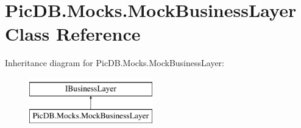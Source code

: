 \hypertarget{class_pic_d_b_1_1_mocks_1_1_mock_business_layer}{}\section{Pic\+D\+B.\+Mocks.\+Mock\+Business\+Layer Class Reference}
\label{class_pic_d_b_1_1_mocks_1_1_mock_business_layer}
Inheritance diagram for Pic\+D\+B.\+Mocks.\+Mock\+Business\+Layer\+:\begin{figure}[H]
\begin{center}
\leavevmode
\includegraphics[height=2.000000cm]{class_pic_d_b_1_1_mocks_1_1_mock_business_layer}
\end{center}
\end{figure}
